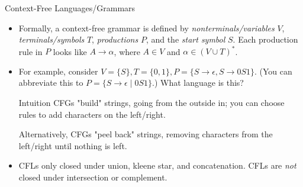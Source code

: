 \documentclass{beamer}
\begin{document}
\begin{frame}[t]{Context-Free Languages/Grammars}
    \begin{itemize}
        \item Formally, a context-free grammar is defined by \textit{nonterminals/variables} $V$, \textit{terminals/symbols} $T$, \textit{productions} $P$, 
        and the \textit{start symbol} $S$. Each production rule in $P$ looks like $A \to \alpha$, where $A \in V$ and $\alpha \in (V \cup T)^*$.

        \item \pause For example, consider $V = \{S\}, T=\{0,1\}, P=\{S \to \epsilon, S \to 0S1 \}$. (You can abbreviate this to $P=\{S \to \epsilon \mid 0S1 \}$.) What language is this?

        \begin{exampleblock}{Intuition}
            CFGs "build" strings, going from the outside in; you can choose rules to add characters on the left/right.
            
            Alternatively, CFGs "peel back" strings, removing characters from the left/right until nothing is left.
        \end{exampleblock}

        \item \pause CFLs only closed under union, kleene star, and concatenation. CFLs are \textit{not} closed under intersection or complement.

    \end{itemize}

    \pause \begin{center}\end{center}
\end{frame}
\end{document}
